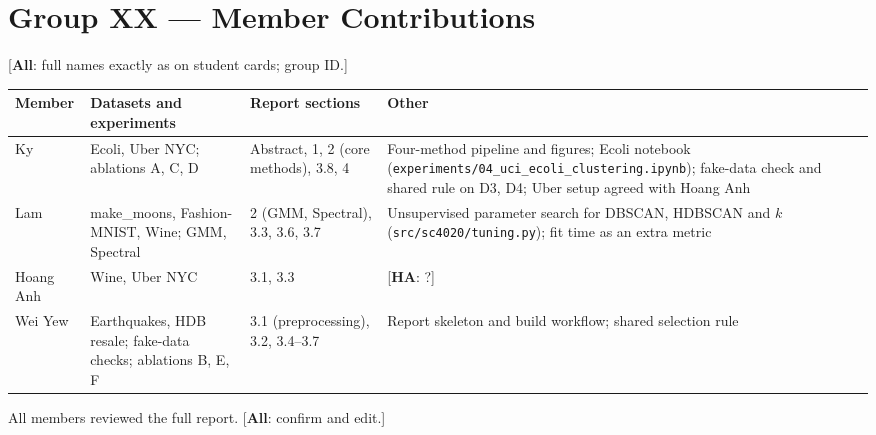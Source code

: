 \documentclass[11pt,a4paper]{article}
\newcommand{\todo}[2]{{\color{red}[\textbf{#1}: #2]}}
\begin{document}
\section*{Group XX --- Member Contributions}
\todo{All}{full names exactly as on student cards; group ID.}

\medskip
\noindent
\begin{tabularx}{\textwidth}{@{}lXXX@{}}
\toprule
\textbf{Member} & \textbf{Datasets and experiments} & \textbf{Report sections} & \textbf{Other} \\
\midrule
Ky & Ecoli, Uber NYC; ablations A, C, D & Abstract, 1, 2 (core methods), 3.8, 4 & Four-method pipeline and figures; Ecoli notebook (\texttt{experiments/04\_uci\_ecoli\_clustering.ipynb}); fake-data check and shared rule on D3, D4; Uber setup agreed with Hoang Anh \\
Lam & make\_moons, Fashion-MNIST, Wine; GMM, Spectral & 2 (GMM, Spectral), 3.3, 3.6, 3.7 & Unsupervised parameter search for DBSCAN, HDBSCAN and $k$ (\texttt{src/sc4020/tuning.py}); fit time as an extra metric \\
Hoang Anh & Wine, Uber NYC & 3.1, 3.3 & \todo{HA}{?} \\
Wei Yew & Earthquakes, HDB resale; fake-data checks; ablations B, E, F & 3.1 (preprocessing), 3.2, 3.4--3.7 & Report skeleton and build workflow; shared selection rule \\
\bottomrule
\end{tabularx}

\medskip
\noindent All members reviewed the full report. \todo{All}{confirm and edit.}
\end{document}
